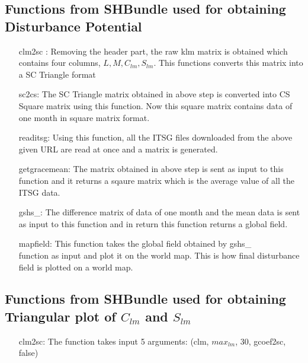 \documentclass[a4paper,12pt]{report}
\begin{document}
\subsection{Functions from SHBundle used for obtaining \\Disturbance Potential}
\begin{itemize}
	\item[clm2sc : ] Removing the header part, the raw 			klm matrix is obtained which contains four columns, $L, 	M, C_{lm}, S_{lm}$. This functions converts this matrix 	into a SC Triangle format
	
	\item[sc2cs:]The SC Triangle matrix obtained in 			above step is converted into CS Square matrix using 			this function. Now this square matrix contains data of 			one month in square matrix format.
	
	\item[readitsg:]Using this function, all the ITSG 	files downloaded from the above given URL are read at 			once and a matrix is generated.
	
	\item[getgracemean:]The matrix obtained in above 			step is sent as input to this function and it returns a 	sqaure matrix which is the average value of all the 			ITSG data.
	
	\item[gshs\_:]The difference matrix of data of 			one month and the mean data is sent as input to this 			function and in return this function returns a global 			field.
	
	\item[mapfield:]This function takes the global 			field obtained by gshs\_\\ function as input and plot 			it on the world map. This is how final disturbance 			field is plotted on a world map.
	
\end{itemize}

\subsection{Functions from SHBundle used for obtaining \\Triangular plot of $C_{lm}$ and $S_{lm}$}
\begin{itemize}
	\item[clm2sc: ] The function takes input 5 arguments: (clm, $max_{lm}$, 30, gcoef2sc, false)
\end{itemize}
\end{document}
